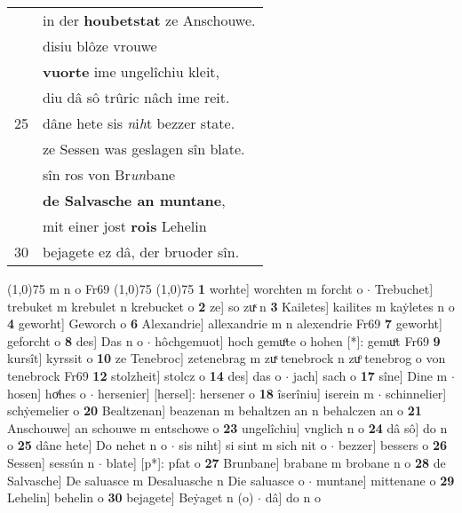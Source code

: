 \documentclass[8pt,a4paper,notitlepage]{article}
\begin{document}
\begin{table}[ht]
\begin{minipage}[t]{0.5\linewidth}
\begin{tabular}{rl}
 & in der \textbf{houbetstat} ze Anschouwe.\\ 
 & disiu blôze vrouwe\\ 
 & \textbf{vuorte} ime ungelîchiu kleit,\\ 
 & diu dâ sô trûric nâch ime reit.\\ 
25 & dâne hete sis \textit{n}i\textit{h}t bezzer state.\\ 
 & ze Sessen was geslagen sîn blate.\\ 
 & sîn ros von Br\textit{un}bane\\ 
 & \textbf{de Salvasche an muntane},\\ 
 & mit einer jost \textbf{rois} Lehelin\\ 
30 & bejagete ez dâ, der bruoder sîn.\\ 
\end{tabular}
\scriptsize
\line(1,0){75} \newline
m n o Fr69 \newline
\line(1,0){75} \newline
\newline
\line(1,0){75} \newline
\textbf{1} worhte] worchten m forcht o  $\cdot$ Trebuchet] trebuket m krebulet n krebucket o \textbf{2} ze] so zuͯ n \textbf{3} Kailetes] kailites m kaẏletes n o \textbf{4} geworht] Geworch o \textbf{6} Alexandrie] allexandrie m n alexendrie Fr69 \textbf{7} geworht] geforcht o \textbf{8} des] Das n o  $\cdot$ hôchgemuot] hoch gemuͦte o hohen [*]: gemuͦt Fr69 \textbf{9} kursît] kyrssit o \textbf{10} ze Tenebroc] zetenebrag m zuͯ tenebrock n zuͦ tenebrog o von tenebrock Fr69 \textbf{12} stolzheit] stolcz o \textbf{14} des] das o  $\cdot$ jach] sach o \textbf{17} sîne] Dine m  $\cdot$ hosen] hoͯhes o  $\cdot$ hersenier] [hersel]: hersener o \textbf{18} îserîniu] iserein m  $\cdot$ schinnelier] schẏemelier o \textbf{20} Bealtzenan] beazenan m behaltzen an n behalczen an o \textbf{21} Anschouwe] an schouwe m entschowe o \textbf{23} ungelîchiu] vnglich n o \textbf{24} dâ sô] do n o \textbf{25} dâne hete] Do nehet n o  $\cdot$ sis niht] si sint m sich nit o  $\cdot$ bezzer] bessers o \textbf{26} Sessen] sessún n  $\cdot$ blate] [p*]: pfat o \textbf{27} Brunbane] brabane m brobane n o \textbf{28} de Salvasche] De saluasce m Desaluasche n Die saluasce o  $\cdot$ muntane] mittenane o \textbf{29} Lehelin] behelin o \textbf{30} bejagete] Beẏaget n (o)  $\cdot$ dâ] do n o \newline
\end{minipage}
\end{table}
\end{document}
